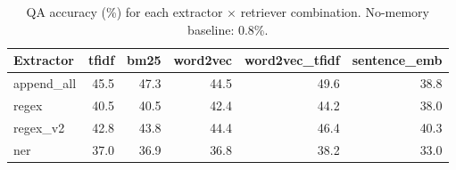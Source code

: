 \begin{table}[t]
\centering
\caption{QA accuracy (\%) for each extractor $\times$ retriever combination. No-memory baseline: 0.8\%.}
\label{tab:main}
\begin{tabular}{lrrrrr}
\toprule
Extractor & tfidf & bm25 & word2vec & word2vec\_tfidf & sentence\_emb \\
\midrule
append\_all & 45.5 & 47.3 & 44.5 & 49.6 & 38.8 \\
regex & 40.5 & 40.5 & 42.4 & 44.2 & 38.0 \\
regex\_v2 & 42.8 & 43.8 & 44.4 & 46.4 & 40.3 \\
ner & 37.0 & 36.9 & 36.8 & 38.2 & 33.0 \\
\bottomrule
\end{tabular}
\end{table}